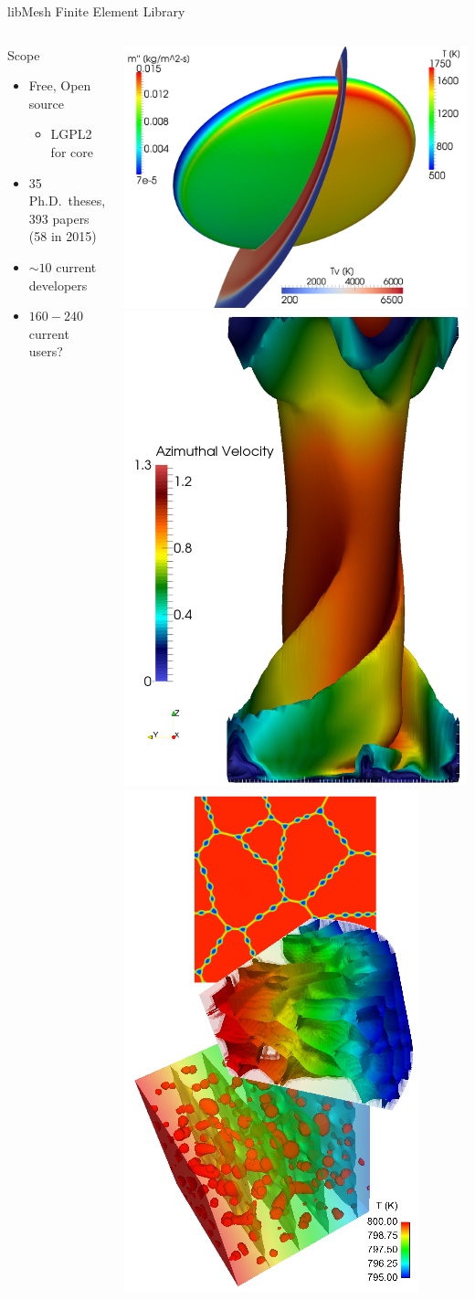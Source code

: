 \documentclass[mathserif]{beamer}
\begin{document}
\begin{frame}{libMesh Finite Element Library}
\begin{columns}
\begin{block}{Scope}
\begin{itemize}
\item Free, Open source
\begin{itemize}
\item LGPL2 for core
\end{itemize}
\item 35 Ph.D.\ theses, 393 papers (58 in 2015)
\item $\sim10$ current developers
\item $160-240$ current users?
\end{itemize}
\end{block}

\includegraphics[width=.45\textwidth]{ablating_hs_wbg}
\includegraphics[width=.25\textwidth]{sov}
\includegraphics[width=.3\textwidth]{marmot1b}
\end{columns}


\end{frame}
\end{document}
